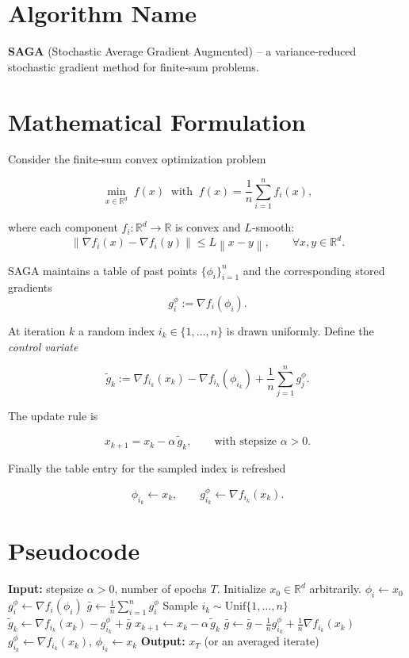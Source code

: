 \documentclass{article}
\newcommand{\R}{\mathbb{R}}
\newcommand{\norm}[1]{\left\lVert #1\right\rVert}
\begin{document}
\section*{Algorithm Name}
\textbf{SAGA} (Stochastic Average Gradient Augmented) – a variance‑reduced stochastic gradient method for finite‑sum problems.

\section*{Mathematical Formulation}
Consider the finite‑sum convex optimization problem  

\[
\min_{x\in\R^{d}} \; f(x)\;\; \text{with}\;\; f(x)=\frac1n\sum_{i=1}^{n}f_i(x),
\tag{1}
\]

where each component $f_i:\R^{d}\rightarrow\R$ is convex and $L$‑smooth:
\[
\norm{\nabla f_i(x)-\nabla f_i(y)}\le L\norm{x-y},\qquad\forall x,y\in\R^{d}.
\tag{2}
\]

SAGA maintains a table of past points $\{\phi_i\}_{i=1}^{n}$ and the corresponding stored gradients
\[
g_i^{\phi}:=\nabla f_i(\phi_i).
\]

At iteration $k$ a random index $i_k\in\{1,\dots,n\}$ is drawn uniformly.  
Define the \emph{control variate}  

\[
\tilde{g}_k:=\nabla f_{i_k}(x_k)-\nabla f_{i_k}(\phi_{i_k})+\frac1n\sum_{j=1}^{n}g_j^{\phi}.
\tag{3}
\]

The update rule is  

\[
x_{k+1}=x_k-\alpha\,\tilde{g}_k,
\qquad\text{with stepsize }\alpha>0.
\tag{4}
\]

Finally the table entry for the sampled index is refreshed  

\[
\phi_{i_k}\leftarrow x_k,\qquad 
g_{i_k}^{\phi}\leftarrow \nabla f_{i_k}(x_k).
\tag{5}
\]

\section*{Pseudocode}
\begin{algorithm}[H]
\caption{SAGA}
\begin{algorithmic}[1]
\STATE \textbf{Input:} stepsize $\alpha>0$, number of epochs $T$.
\STATE Initialize $x_0\in\R^{d}$ arbitrarily.
    \STATE $\phi_i\gets x_0$ 
    \STATE $g_i^{\phi}\gets \nabla f_i(\phi_i)$
\ENDFOR
\STATE $\bar g\gets \frac1n\sum_{i=1}^{n} g_i^{\phi}$ 
    \STATE Sample $i_k\sim \mathrm{Unif}\{1,\dots,n\}$
    \STATE $\tilde g_k\gets \nabla f_{i_k}(x_k)-g_{i_k}^{\phi}+\bar g$
    \STATE $x_{k+1}\gets x_k-\alpha\,\tilde g_k$
    \STATE %
    \STATE $\bar g\gets \bar g -\frac{1}{n}g_{i_k}^{\phi}+ \frac{1}{n}\nabla f_{i_k}(x_k)$
    \STATE $g_{i_k}^{\phi}\gets \nabla f_{i_k}(x_k)$,\; $\phi_{i_k}\gets x_k$
\ENDFOR
\STATE \textbf{Output:} $x_T$ (or an averaged iterate)
\end{algorithmic}
\end{algorithm}
\end{document}
